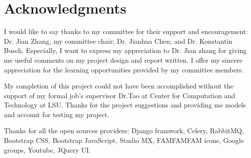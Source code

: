 \cleardoublepage
{}
{}
\chapter*{Acknowledgments}
\vspace{1.0in}

I would like to say thanks to my committee for their support and encouragement: Dr. Jian Zhang, my committee chair; Dr. Jianhua Chen; and Dr. Konstantin Busch. Especially, I want to express my appreciation to Dr. Jian zhang for giving me useful comments on my project design and report written. I offer my sincere appreciation for the learning opportunities provided by my committee members.

My completion of this project could not have been accomplished without the support of 
my formal job's supervisor Dr.Tao at Center for Computation and Technology at LSU. Thanks for the project suggestions and providing me models and account for testing my project.

Thanks for all the open sources providers: Django framwork, Celery, RabbitMQ, Bootstrap CSS, Bootstrap JavaScript, Studio MX, FAMFAMFAM icons, Google groups, Youtube, JQuery UI.

\newpage
